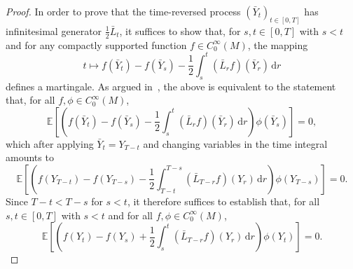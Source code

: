 \documentclass[10pt]{amsart}
\theoremstyle{remark}
\newcommand{\dd}{\,{\mathrm d}}
\numberwithin{equation}{section}
\begin{document}
\begin{proof}
In order to prove that the time-reversed process $(\bar{Y}_t)_{t\in[0,T]}$ has infinitesimal generator $\frac{1}{2}\bar{L}_t$, it suffices to show that, for $s,t\in [0,T]$ with $s<t$ and for any compactly supported function $f \in C^\infty_0(M)$, the mapping
$$t \mapsto f(\bar{Y}_t) - f(\bar{Y}_s) - \frac{1}{2} \int_s^t (\bar{L}_r f)(\bar{Y}_r) \dd r$$
defines a martingale.
As argued in~\cite{haussmann1986time}, the above is equivalent to the statement that, for all $f, \phi \in C^\infty_0(M)$,
$$\mathbb{E}\left[ \left(f(\bar{Y}_t) - f(\bar{Y}_s) - \frac{1}{2} \int_s^t (\bar{L}_r f)(\bar{Y}_r) \dd r \right) \phi(\bar{Y}_s)\right] = 0,$$
which after applying $\bar{Y}_t = Y_{T-t}$ and changing variables in the time integral amounts to
$$\mathbb{E}\left[ \left(f(Y_{T-t}) - f(Y_{T-s}) - \frac{1}{2} \int_{T-t}^{T-s} (\bar{L}_{T-r} f)(Y_r) \dd r \right) \phi(Y_{T-s})\right] = 0.$$
Since $T-t<T-s$ for $s<t$, it therefore suffices to establish that, for all $s,t\in [0,T]$ with $s<t$ and for all $f, \phi \in C^\infty_0(M)$,
$$\mathbb{E}\left[ \left(f(Y_{t}) - f(Y_{s})  + \frac{1}{2} \int_{s}^{t} (\bar{L}_{T-r} f)(Y_{r}) \dd r \right) \phi(Y_{t})\right] = 0.$$


\end{proof}
\end{document}
